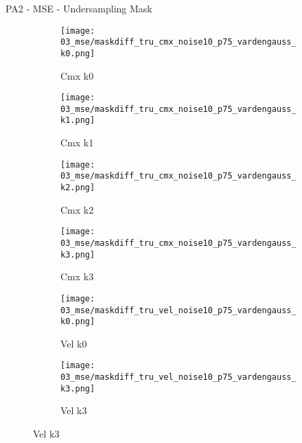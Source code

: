 \documentclass{beamer}
\begin{document}
\begin{frame}{PA2 - MSE - Undersampling Mask}{}
\begin{figure}
\begin{subfigure}{0.24\textwidth}
\texttt{[image: 03\_mse/maskdiff\_tru\_cmx\_noise10\_p75\_vardengauss\_k0.png]}
\vspace{-20pt}
\caption*{\tiny Cmx k0}
\end{subfigure}
\begin{subfigure}{0.24\textwidth}
\texttt{[image: 03\_mse/maskdiff\_tru\_cmx\_noise10\_p75\_vardengauss\_k1.png]}
\vspace{-20pt}
\caption*{\tiny Cmx k1}
\end{subfigure}
\begin{subfigure}{0.24\textwidth}
\texttt{[image: 03\_mse/maskdiff\_tru\_cmx\_noise10\_p75\_vardengauss\_k2.png]}
\vspace{-20pt}
\caption*{\tiny Cmx k2}
\end{subfigure}
\begin{subfigure}{0.24\textwidth}
\texttt{[image: 03\_mse/maskdiff\_tru\_cmx\_noise10\_p75\_vardengauss\_k3.png]}
\vspace{-20pt}
\caption*{\tiny Cmx k3}
\end{subfigure}

\begin{subfigure}{0.49\textwidth}
\texttt{[image: 03\_mse/maskdiff\_tru\_vel\_noise10\_p75\_vardengauss\_k0.png]}
\vspace{-20pt}
\caption*{\tiny Vel k0}
\end{subfigure}
\begin{subfigure}{0.49\textwidth}
\texttt{[image: 03\_mse/maskdiff\_tru\_vel\_noise10\_p75\_vardengauss\_k3.png]}
\vspace{-20pt}
\caption*{\tiny Vel k3}
\end{subfigure}
\end{figure}
\end{frame}
\end{document}

